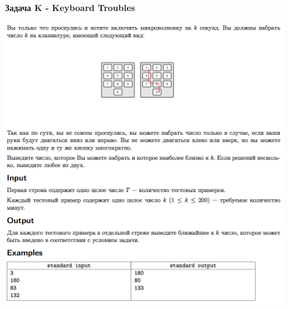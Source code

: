 \documentclass[a4paper,12pt]{article}
\begin{document}
\textbf{{\large Задача K - Keyboard Troubles}} \\
\begin{center}
\includegraphics[width=0.9\textwidth]{OC_Europe/OC_Europe_K.png}\\ [1cm]
\end{center}
\newpage
\end{document}
